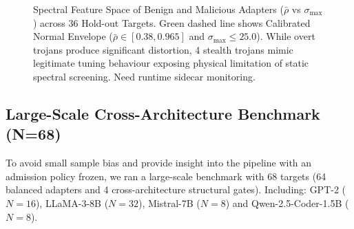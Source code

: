 \begin{figure}[t]
\centering
{}
\caption{Spectral Feature Space of Benign and Malicious Adapters ($\bar{\rho}$ vs $\sigma_{\max}$) across 36 Hold-out Targets. Green dashed line shows Calibrated Normal Envelope ($\bar{\rho} \in [0.38, 0.965]$ and $\sigma_{\max} \le 25.0$). While overt trojans produce significant distortion, 4 stealth trojans mimic legitimate tuning behaviour exposing physical limitation of static spectral screening. Need runtime sidecar monitoring.}
\label{fig:spectral_envelopes}
\end{figure}

\subsection{Large-Scale Cross-Architecture Benchmark (N=68)}
\label{subsec:exp_scaled}

To avoid small sample bias and provide insight into the pipeline with an admission policy frozen, we ran a large-scale benchmark with 68 targets (64 balanced adapters and 4 cross-architecture structural gates). Including: GPT-2 ($N=16$), LLaMA-3-8B ($N=32$), Mistral-7B ($N=8$) and Qwen-2.5-Coder-1.5B ($N=8$).

\begin{table}[t]
\centering
\caption{Confusion Matrix \& Performance by Model (Native $N=64$ Balanced Cohort)}
\label{tab:scaled_benchmark}
\end{table}

